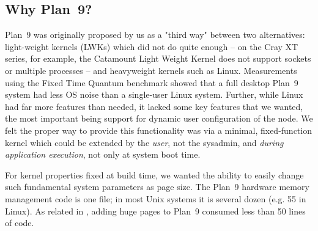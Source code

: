 \documentclass[a4,10pt,preprint]{sigplanconf}
\begin{document}
\subsection{Why Plan~9?}
Plan~9 was originally proposed by us as a "third way" between two alternatives: light-weight kernels (LWKs) which did not do quite enough -- on the Cray XT series, for example, the Catamount Light Weight Kernel does not support sockets or multiple processes -- and heavyweight kernels such as Linux. Measurements using the Fixed Time Quantum\cite{ftq} benchmark showed that a full desktop Plan~9 system had less OS noise than a single-user Linux system. Further, while Linux had far more features than needed, it lacked some key features that we wanted, the most important being support for dynamic user configuration of the node. We felt the proper way to provide this functionality was via a minimal, fixed-function kernel which could be extended by the \textit{user}, not the sysadmin, and \textit{during application execution}, not only at system boot time. 

For kernel properties fixed at build time, we wanted the ability to easily change such fundamental system parameters as page size. The Plan~9 hardware memory management code is one file; in most Unix systems it is several dozen (e.g. 55 in Linux). As related in \cite{plan9bgp}, adding huge pages to Plan~9 consumed less than 50 lines of code. 
\end{document}
